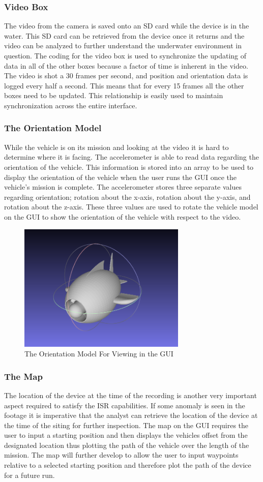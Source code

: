 \documentclass{report}
\begin{document}
\subsubsection{Video Box}
The video from the camera is saved onto an SD card while the device is in the water. This SD card can be retrieved from the device once it returns and the video can be analyzed to further understand the underwater environment in question. The coding for the video box is used to synchronize the updating of data in all of the other boxes because a factor of time is inherent in the video. The video is shot a 30 frames per second, and position and orientation data is logged every half a second. This means that for every 15 frames all the other boxes need to be updated. This relationship is easily used to maintain synchronization across the entire interface.
\subsubsection{The Orientation Model}
While the vehicle is on its mission and looking at the video it is hard to determine where it is facing. The accelerometer is able to read data regarding the orientation of the vehicle. This information is stored into an array to be used to display the orientation of the vehicle when the user runs the GUI once the vehicle’s mission is complete. The accelerometer stores three separate values regarding orientation; rotation about the x-axis, rotation about the y-axis, and rotation about the z-axis. These three values are used to rotate the vehicle model on the GUI to show the orientation of the vehicle with respect to the video.
\begin{figure}[H]
\centering
\includegraphics[width=8cm]{"guiOrientation"}
\caption{The Orientation Model For Viewing in the GUI}
\end{figure}
\subsubsection{The Map}
The location of the device at the time of the recording is another very important aspect required to satisfy the ISR capabilities. If some anomaly is seen in the footage it is imperative that the analyst can retrieve the location of the device at the time of the siting for further inspection. The map on the GUI requires the user to input a starting position and then displays the vehicles offset from the designated location thus plotting the path of the vehicle over the length of the mission. The map will further develop to allow the user to input waypoints relative to a selected starting position and therefore plot the path of the device for a future run.
\end{document}
